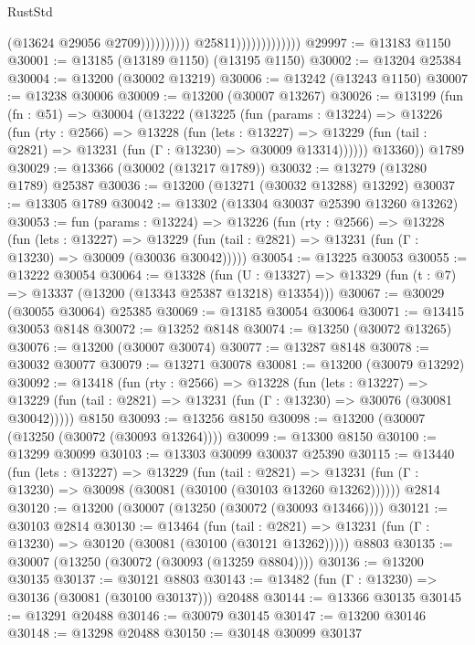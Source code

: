 \begin{lexlean}{RustStd}
\begin{coremodule}
                                                (@13624 @29056 @2709))))))))))
                              @25811)))))))))))))
@29997 := @13183 @1150
@30001 := @13185 (@13189 @1150) (@13195 @1150)
@30002 := @13204 @25384
@30004 := @13200 (@30002 @13219)
@30006 := @13242 (@13243 @1150)
@30007 := @13238 @30006
@30009 := @13200 (@30007 @13267)
@30026 := @13199
    (fun (fn : @51) =>
    @30004
      (@13222
        (@13225
          (fun (params : @13224) =>
          @13226
            (fun (rty : @2566) =>
            @13228
              (fun (lets : @13227) =>
              @13229 (fun (tail : @2821) => @13231 (fun (Γ : @13230) => @30009 @13314))))))
        @13360))
    @1789
@30029 := @13366 (@30002 (@13217 @1789))
@30032 := @13279 (@13280 @1789) @25387
@30036 := @13200 (@13271 (@30032 @13288) @13292)
@30037 := @13305 @1789
@30042 := @13302 (@13304 @30037 @25390 @13260 @13262)
@30053 := fun (params : @13224) =>
  @13226
    (fun (rty : @2566) =>
    @13228
      (fun (lets : @13227) =>
      @13229 (fun (tail : @2821) => @13231 (fun (Γ : @13230) => @30009 (@30036 @30042)))))
@30054 := @13225 @30053
@30055 := @13222 @30054
@30064 := @13328
    (fun (U : @13327) => @13329 (fun (t : @7) => @13337 (@13200 (@13343 @25387 @13218) @13354)))
@30067 := @30029 (@30055 @30064) @25385
@30069 := @13185 @30054 @30064
@30071 := @13415 @30053 @8148
@30072 := @13252 @8148
@30074 := @13250 (@30072 @13265)
@30076 := @13200 (@30007 @30074)
@30077 := @13287 @8148
@30078 := @30032 @30077
@30079 := @13271 @30078
@30081 := @13200 (@30079 @13292)
@30092 := @13418
    (fun (rty : @2566) =>
    @13228
      (fun (lets : @13227) =>
      @13229 (fun (tail : @2821) => @13231 (fun (Γ : @13230) => @30076 (@30081 @30042)))))
    @8150
@30093 := @13256 @8150
@30098 := @13200 (@30007 (@13250 (@30072 (@30093 @13264))))
@30099 := @13300 @8150
@30100 := @13299 @30099
@30103 := @13303 @30099 @30037 @25390
@30115 := @13440
    (fun (lets : @13227) =>
    @13229
      (fun (tail : @2821) =>
      @13231 (fun (Γ : @13230) => @30098 (@30081 (@30100 (@30103 @13260 @13262))))))
    @2814
@30120 := @13200 (@30007 (@13250 (@30072 (@30093 @13466))))
@30121 := @30103 @2814
@30130 := @13464
    (fun (tail : @2821) => @13231 (fun (Γ : @13230) => @30120 (@30081 (@30100 (@30121 @13262)))))
    @8803
@30135 := @30007 (@13250 (@30072 (@30093 (@13259 @8804))))
@30136 := @13200 @30135
@30137 := @30121 @8803
@30143 := @13482 (fun (Γ : @13230) => @30136 (@30081 (@30100 @30137))) @20488
@30144 := @13366 @30135
@30145 := @13291 @20488
@30146 := @30079 @30145
@30147 := @13200 @30146
@30148 := @13298 @20488
@30150 := @30148 @30099 @30137

\end{coremodule}
\end{lexlean}
